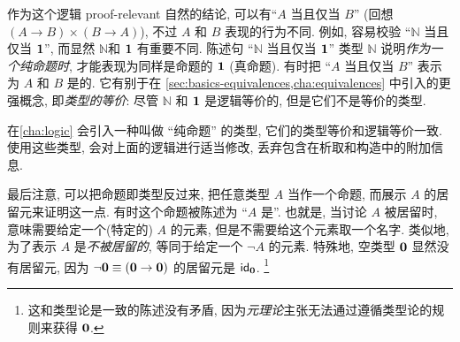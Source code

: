 作为这个逻辑 proof-relevant 自然的结论, 可以有``$A$ 当且仅当 $B$'' (回想 $(A\to B)\times (B\to A)$), 不过 $A$ 和 $B$ 表现的行为不同.
例如, 容易校验 ``$\mathbb{N}$ 当且仅当 $\unit$'', 而显然 $\mathbb{N}$和 $\unit$ 有重要不同.
陈述句 ``$\mathbb{N}$ 当且仅当 $\unit$'' 类型 $\mathbb{N}$ 说明\emph{作为一个纯命题时}, 才能表现为同样是命题的 $\unit$ (真命题).
有时把 ``$A$ 当且仅当 $B$'' 表示为 $A$ 和 $B$ 是的.
%
%
它有别于在 \cref{sec:basics-equivalences,cha:equivalences} 中引入的更强概念, 即\emph{类型的等价}: 尽管 $\mathbb{N}$ 和 $\unit$ 是逻辑等价的, 但是它们不是等价的类型.

在\cref{cha:logic} 会引入一种叫做 ``纯命题'' 的类型, 它们的类型等价和逻辑等价一致.
使用这些类型, 会对上面的逻辑进行适当修改,  丢弃包含在析取和构造中的附加信息.

最后注意, 可以把命题即类型反过来, 把任意类型 $A$ 当作一个命题, 而展示 $A$ 的居留元来证明这一点.
有时这个命题被陈述为 ``$A$ 是''.
%
%
也就是, 当讨论 $A$ 被居留时, 意味需要给定一个(特定的) $A$ 的元素, 但是不需要给这个元素取一个名字.
类似地, 为了表示 $A$ 是\emph{不被居留的}, 等同于给定一个 $\neg A$ 的元素.
特殊地, 空类型 $\emptyt$ 显然没有居留元, 因为 $\neg \emptyt \jdeq (\emptyt \to \emptyt)$ 的居留元是 $\idfunc[\emptyt]$.
\footnote{这和类型论是一致的陈述没有矛盾, 因为\emph{元理论}主张无法通过遵循类型论的规则来获得 $\emptyt$.}

%
%
%